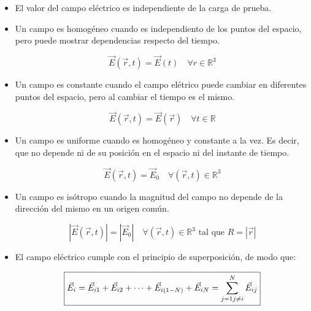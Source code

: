 \documentclass[a4paper,10pt]{article}
\begin{document}
\begin{itemize}

\item El valor del campo el\'ectrico es independiente de la carga de prueba.

\item Un campo es homog\'eneo cuando es independiento de los puntos del espacio,
pero puede mostrar dependencias respecto del tiempo.

\begin{equation*}
    \boxed{\vec{E}(\vec{r},t)=\vec{E}(t)\quad\forall r\in\mathbb{R}^3}
\end{equation*}

\item Un campo es constante cuando el campo el\'etrico puede cambiar en diferentes
puntos del espacio, pero al cambiar el tiempo es el mismo.

\begin{equation*}
    \boxed{\vec{E}(\vec{r},t)=\vec{E}(\vec{r})\quad\forall t\in\mathbb{R}}
\end{equation*}

\item Un campo es uniforme cuando es homog\'eneo y constante a la vez.
Es decir, que no depende ni de su posici\'on en el espacio ni del instante de tiempo.

\begin{equation*}
    \boxed{\vec{E}(\vec{r},t)=\vec{E}_0\quad\forall (\vec{r},t)\in\mathbb{R}^3}
\end{equation*}

\item Un campo es is\'otropo cuando la magnitud del campo no depende
de la direcci\'on del mismo en un origen com\'un.

\begin{equation*}
    \boxed{\left\lvert\vec{E}(\vec{r},t)\right\lvert=
    \left\lvert\vec{E}_0\right\lvert\quad\forall (\vec{r},t)\in\mathbb{R}^3
    \textrm{ tal que }R=\left\lvert\vec{r}\right\lvert}
\end{equation*}


\item El campo el\'ectrico cumple con el principio de superposici\'on, de modo
que:

\begin{equation*}
    \boxed{\vec{E}_i=\vec{E}_{i1}+\vec{E}_{i2}+\cdots+\vec{E}_{i(1-N)}+\vec{E}_{iN}=
    \sum_{j=1\\j\neq i}^{N}\vec{E}_{ij}}
\end{equation*}


\end{itemize}
\end{document}
